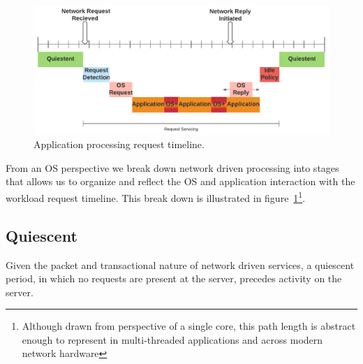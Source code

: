 
\begin{figure}
\centering
\includegraphics[width=1.1\columnwidth]{figures/timeline_chart}
\vspace*{-10mm}
\caption[]{Application processing request timeline.}
\label{fig:timeline}
\vspace{-0.20in}
\end{figure}

From an OS perspective we break down network driven processing into stages that allows us to organize and reflect the OS and application interaction with the workload request timeline. This break down is illustrated in figure~\ref{fig:timeline}\footnote{Although drawn from perspective of a single core, this path length is abstract enough to represent in multi-threaded applications and across modern network hardware}.

\subsection{Quiescent}
\label{sec:workflow:Quiescent}
Given the packet and transactional nature of network driven services, a quiescent period, in which no requests are present at the server, precedes activity on the server. 

